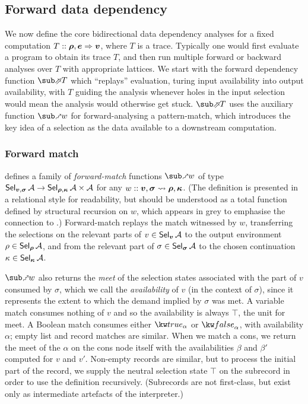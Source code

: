 \subsection{Forward data dependency}
\label{sec:data-dependencies:analyses:fwd}

We now define the core bidirectional data dependency analyses for a fixed computation $T :: \bm{\rho}, \bm{e} \Rightarrow \bm{v}$, where $T$ is a trace. Typically one would first evaluate a program to obtain its trace $T$, and then run multiple forward or backward analyses over $T$ with appropriate lattices. We start with the forward dependency function $\evalFwdF{T}$ which ``replays'' evaluation, turing input availability into output availability, with $T$ guiding the analysis whenever holes in the input selection would mean the analysis would otherwise get stuck. $\evalFwdF{T}$ uses the auxiliary function $\matchFwdF{w}$ for forward-analysing a pattern-match, which introduces the key idea of a selection as the data available to a downstream computation.



\subsubsection{Forward match}
\label{sec:data-dependencies:analyses:fwd:pattern-match}

 defines a family of \emph{forward-match} functions $\matchFwdF{w}$ of type $\textup{\textsf{Sel}}_{\bm{v}, \bm{\sigma}}\,{\mathcal{A}} \to \textup{\textsf{Sel}}_{\bm{\rho}, \bm{\kappa}}\,{\mathcal{A}} \times \mathcal{A}$ for any $w :: \bm{v}, \bm{\sigma} \rightsquigarrow \bm{\rho}, \bm{\kappa}$. (The definition is presented in a relational style for readability, but should be understood as a total function defined by structural recursion on $w$, which appears in grey to emphasise the connection to .) Forward-match replays the match witnessed by $w$, transferring the selections on the relevant parts of $v \in \textup{\textsf{Sel}}_{\bm{v}}\,{\mathcal{A}}$ to the output environment $\rho \in \textup{\textsf{Sel}}_{\bm{\rho}}\,{\mathcal{A}}$, and from the relevant part of $\sigma \in \textup{\textsf{Sel}}_{\bm{\sigma}}\,{\mathcal{A}}$ to the chosen continuation $\kappa \in \textup{\textsf{Sel}}_{\bm{\kappa}}\,{\mathcal{A}}$.

$\matchFwdF{w}$ also returns the \emph{meet} of the selection states associated with the part of $v$ consumed by $\sigma$, which we call the \emph{availability} of $v$ (in the context of $\sigma$), since it represents the extent to which the demand implied by $\sigma$ was met. A variable match consumes nothing of $v$ and so the availability is always $\top$, the unit for meet. A Boolean match consumes either $\annot{\exTrue}{\alpha}$ or $\annot{\exFalse}{\alpha}$, with availability $\alpha$; empty list and record matches are similar. When we match a cons, we return the meet of the $\alpha$ on the cons node itself with the availabilities $\beta$ and $\beta'$ computed for $v$ and $v'$. Non-empty records are similar, but to process the initial part of the record, we supply the neutral selection state $\top$ on the subrecord in order to use the definition recursively. (Subrecords are not first-class, but exist only as intermediate artefacts of the interpreter.)

